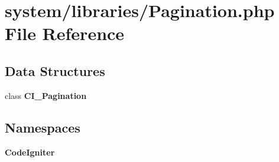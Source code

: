 \section{system/libraries/\-Pagination.php File Reference}
\label{_pagination_8php}
\subsection*{Data Structures}
\begin{DoxyCompactItemize}
\item 
class {\bf C\-I\-\_\-\-Pagination}
\end{DoxyCompactItemize}
\subsection*{Namespaces}
\begin{DoxyCompactItemize}
\item 
{\bf Code\-Igniter}
\end{DoxyCompactItemize}
